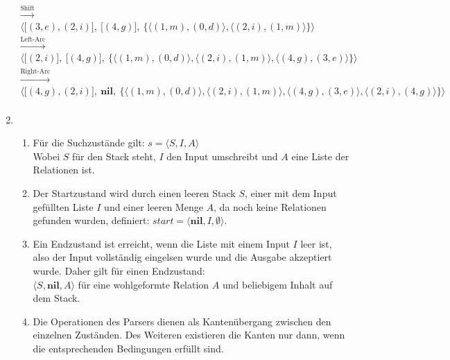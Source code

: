 \documentclass[a4paper]{scrartcl}
\begin{document}
\begin{enumerate}
\begin{gather*}
            \xrightarrow{\text{Shift}} \\
            \Big\langle \big[ (3, e), (2, i) \big],\ 
            \big[ (4, g) \big],\ 
            \big\{ \langle (1, m), (0, d) \rangle,
                   \langle (2, i), (1, m) \rangle
            \big \} \Big \rangle \\
            \xrightarrow{\text{Left-Arc}} \\
            \Big\langle \big[ (2, i) \big],\ 
            \big[ (4, g) \big],\ 
            \big\{ \langle (1, m), (0, d) \rangle,
                   \langle (2, i), (1, m) \rangle, 
                   \langle (4, g), (3, e) \rangle
            \big\} \Big\rangle \\
            \xrightarrow{\text{Right-Arc}} \\
            \Big\langle \big[ (4, g), (2, i) \big],\
            \mathbf{nil},\ 
            \big\{ \langle (1, m), (0, d) \rangle,
                   \langle (2, i), (1, m) \rangle,
                   \langle (4, g), (3, e) \rangle,
                   \langle (2, i), (4, g) \rangle
            \big\} \Big\rangle \\
        \end{gather*}
\newpage
    \item
		\begin{enumerate}
			\item
				Für die Suchzustände gilt: $s = \langle S,I,A \rangle$ \\
				Wobei $S$ für den Stack steht, $I$ den Input umschreibt und $A$ eine Liste der Relationen 
				ist.
				
			\item
				Der Startzustand wird durch einen leeren Stack $S$, einer mit dem Input gefüllten Liste
				$I$ und einer leeren Menge $A$, da noch keine Relationen gefunden wurden, definiert:
                $start = \langle \mathbf{nil} ,I,\emptyset \rangle$.
				
			\item
				Ein Endzustand ist erreicht, wenn die Liste mit einem Input $I$ leer ist, also der Input 
				vollständig eingelsen wurde und die Ausgabe akzeptiert wurde.
				Daher gilt für einen Endzustand: \\ 
                $\langle S,\mathbf{nil},A \rangle$ für eine wohlgeformte Relation $A$ und beliebigem Inhalt auf dem Stack.
				
			\item
				Die Operationen des Parsers dienen als Kantenübergang zwischen den einzelnen Zuständen.
				Des Weiteren existieren die Kanten nur dann, wenn die entsprechenden Bedingungen erfüllt 
				sind. \\
				

\end{enumerate}
\end{enumerate}
\end{document}
